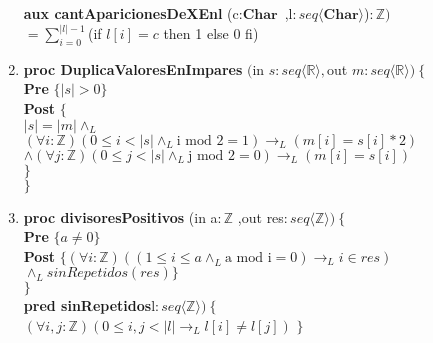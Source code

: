 \documentclass[a4paper]{article}
\begin{document}
\begin{enumerate}[label=\alph*)]
			\textbf{aux cantAparicionesDeXEnl }(c$: \textbf{Char}$
			,l$: seq\langle \textbf{Char}\rangle$)$:\mathbb{Z})$\smallskip \\
			\hspace*{6mm} $=\sum_{i=0}^{|l|-1}$(if $l[i]=c$ then 1 else 0 fi)\\
			
		\item
		
			\textbf{proc DuplicaValoresEnImpares}
			$($in $s: seq\langle \mathbb{R}\rangle,$out $m: seq\langle \mathbb{R}\rangle)\ \{$	\\
					\hspace*{6mm}\textbf{Pre }$\{ |s|>0\}$\\
					\hspace*{6mm}\textbf{Post }$\{$\\
					\hspace*{10mm}$|s|=|m|\wedge_L$\\
					\hspace*{10mm}$(\forall i: \mathbb{Z})(0\leq i <|s|\wedge_L
					\textrm{i mod }2=1)\rightarrow_L(m[i]=s[i]*2)$\\
					\hspace*{10mm}$\wedge(\forall j: \mathbb{Z})(0\leq j <|s|\wedge_L
					\textrm{j mod }2=0)\rightarrow_L(m[i]=s[i])$\\
					\hspace*{6mm}$\}$\\
			$\}$
		\item
			
			\textbf{proc divisoresPositivos }(in a$: \mathbb{Z}$
				,out res$: seq\langle \mathbb{Z}\rangle)\ \{$\smallskip \\
			\hspace*{6mm} \textbf{Pre }$\{a\neq 0\}$\smallskip \\
			\hspace*{6mm} \textbf{Post }$\{(\forall i:\mathbb{Z})
				((1\leq i \leq a\wedge_L \textrm{a mod i}=0)
				\rightarrow_L i\in res)$\\
			\hspace*{6mm}$\wedge_L sinRepetidos(res)\}$\\
			$\}$\smallskip \\
			
			\textbf{pred sinRepetidos}l$: seq\langle \mathbb{Z}\rangle)\ \{$\smallskip \\
			\hspace*{6mm}$(\forall i,j:\mathbb{Z})(0\leq i,j< |l|\rightarrow_L l[i]\neq l[j])$
			$\}$
	\end{enumerate}
	
\end{document}

